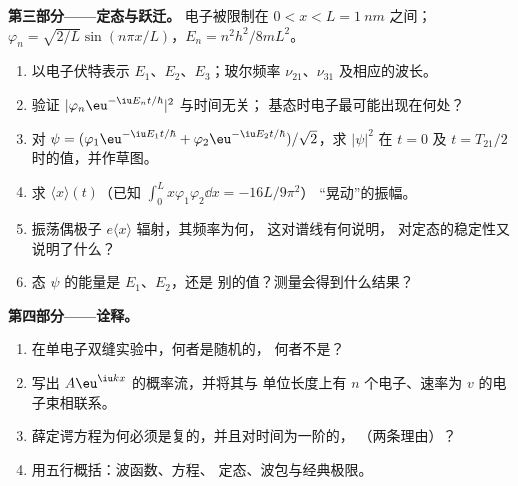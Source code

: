 \begin{problem}
\textbf{第三部分——定态与跃迁。}
电子被限制在 $0 < x < L = \qty{1}{nm}$ 之间；$\varphi_n =
\sqrt{2/L}\sin(n\pi x/L)$，$E_n = n^2h^2/8mL^2$。
\begin{enumerate}[resume]
  \item 以电子伏特表示 $E_1$、$E_2$、$E_3$；玻尔频率
        $\nu_{21}$、$\nu_{31}$ 及相应的波长。
  \item 验证 $|\varphi_n\eu^{-\iu E_nt/\hbar}|^2$ 与时间无关；
        基态时电子最可能出现在何处？
  \item 对 $\psi = (\varphi_1\eu^{-\iu E_1t/\hbar} + \varphi_2\eu^{-\iu E_2t/\hbar})/
        \sqrt2$，求 $|\psi|^2$ 在 $t = 0$ 及 $t = T_{21}/2$ 时的值，并作草图。
  \item 求 $\langle x\rangle(t)$（已知 $\int_0^Lx\varphi_1\varphi_2\dd x = -16L/9\pi^2$）
        “晃动”的振幅。
  \item 振荡偶极子 $e\langle x\rangle$ 辐射，其频率为何，
        这对谱线有何说明，
        对定态的稳定性又说明了什么？
  \item 态 $\psi$ 的能量是 $E_1$、$E_2$，还是
        别的值？测量会得到什么结果？
\end{enumerate}

\textbf{第四部分——诠释。}
\begin{enumerate}[resume]
  \item 在单电子双缝实验中，何者是随机的，
        何者不是？
  \item 写出 $A\eu^{\iu kx}$ 的概率流，并将其与
        单位长度上有 $n$ 个电子、速率为 $v$ 的电子束相联系。
  \item 薛定谔方程为何必须是复的，并且对时间为一阶的，
        （两条理由）？
  \item 用五行概括：波函数、方程、
        定态、波包与经典极限。
\end{enumerate}
\end{problem}

